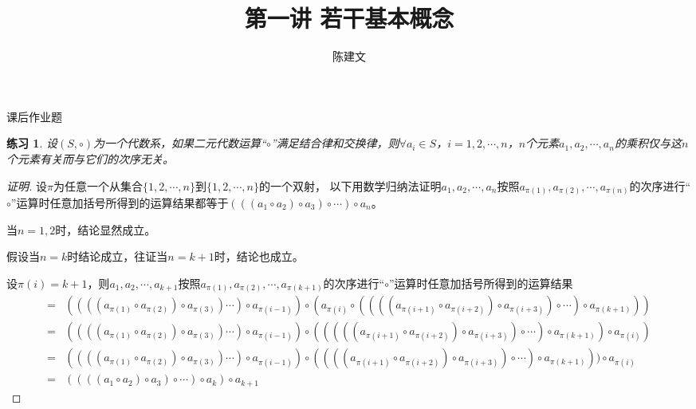 \documentclass{article}
\newtheorem{Exercise}{练习}
\begin{document}
\begin{CJK*}{UTF8}{gbsn}
  \title{第一讲 若干基本概念}
  \author{陈建文}
  \maketitle
 
  课后作业题

  \begin{Exercise}
    设$(S,\circ)$为一个代数系，如果二元代数运算“$\circ$”满足结合律和交换律，则$\forall a_i\in S$，$i=1,2,\cdots,n$，$n$个元素$a_1,a_2,\cdots,a_n$的乘积仅与这$n$个元素有关而与它们的次序无关。
  \end{Exercise}

\begin{proof}[证明]
    设$\pi$为任意一个从集合$\{1,2,\cdots,n\}$到$\{1,2,\cdots,n\}$的一个双射，
    以下用数学归纳法证明$a_{1},a_{2},\cdots,a_{n}$按照$a_{\pi(1)},a_{\pi(2)}, \cdots, a_{\pi(n)}$的次序进行“$\circ$”运算时任意加括号所得到的运算结果都等于$(((a_1\circ a_2)\circ a_3)\circ \cdots )\circ a_n$。

    当$n=1,2$时，结论显然成立。

    假设当$n=k$时结论成立，往证当$n=k+1$时，结论也成立。

    设$\pi(i)=k+1$，则$a_{1},a_{2},\cdots,a_{k+1}$按照$a_{\pi(1)},a_{\pi(2)}, \cdots, a_{\pi(k+1)}$的次序进行“$\circ$”运算时任意加括号所得到的运算结果
    \begin{align*}
        =&((((a_{\pi(1)}\circ a_{\pi(2)})\circ a_{\pi(3)}) \cdots )\circ a_{\pi(i-1)})\circ (a_{\pi(i)} \circ ((((a_{\pi(i+1)}\circ a_{\pi(i+2)})\circ a_{\pi(i+3)})\circ \cdots )\circ a_{\pi(k+1)}))\\
        =&((((a_{\pi(1)}\circ a_{\pi(2)})\circ a_{\pi(3)}) \cdots )\circ a_{\pi(i-1)})\circ (((((a_{\pi(i+1)}\circ a_{\pi(i+2)})\circ a_{\pi(i+3)})\circ \cdots )\circ a_{\pi(k+1)})\circ a_{\pi(i)} )\\
        =&((((a_{\pi(1)}\circ a_{\pi(2)})\circ a_{\pi(3)}) \cdots )\circ a_{\pi(i-1)})\circ ((((a_{\pi(i+1)}\circ a_{\pi(i+2)})\circ a_{\pi(i+3)})\circ \cdots )\circ a_{\pi(k+1)}))\circ a_{\pi(i)}\\
        =&((((a_1\circ a_2)\circ a_3)\circ \cdots) \circ a_{k})\circ a_{k+1}
    \end{align*}
\end{proof}
\end{CJK*}
\end{document}
